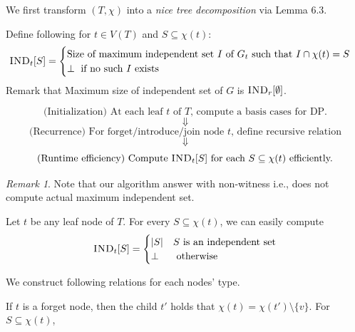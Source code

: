 \documentclass[12pt, a4paper, openany, twoside]{book}
\theoremstyle{definition}
\theoremstyle{remark}
\newtheorem{rem}[thm]{Remark}
\theoremstyle{plain}
\numberwithin{equation}{section}
\begin{document}
\begin{tcolorbox}[colback=yellow!10!white,colframe=gray!75!black,title=Step 0]

We first transform $(T, \chi)$ into a \textit{nice tree decomposition} via Lemma 6.3. 

\end{tcolorbox}

\begin{tcolorbox}[colback=yellow!10!white,colframe=gray!75!black,title=Step 1]

Define following for $t \in V(T)$ and $S \subseteq \chi(t)$: 
\[\textsc{IND}_t[S] = \begin{cases}
    \text{Size of maximum independent set $I$ of $G_t$ such that $I \cap \chi(t) = S$} \\
    \perp \text{ if no such $I$ exists }
\end{cases}\]
Remark that Maximum size of independent set of $G$ is $\textsc{IND}_r[\emptyset]$. 
\end{tcolorbox}

\begin{tcolorbox}[colback=yellow!10!white,colframe=violet!75!white,title=Planning Mode]
    \[\text{(Initialization) At each leaf $t$ of $T$, compute a basis cases for DP.}\] 
    \[\Downarrow\]
    \[\text{(Recurrence) For forget/introduce/join node $t$, define recursive relation}\]
    \[\Downarrow\]
    \[\text{(Runtime efficiency) Compute $\textsc{IND}_t[S]$ for each $S \subseteq \chi(t)$ efficiently.}\]
\end{tcolorbox}

\begin{rem}
Note that our algorithm answer with non-witness i.e., does not compute actual maximum independent set. 
\end{rem}

\begin{tcolorbox}[colback=yellow!10!white,colframe=gray!75!black,title=Initialization]

Let $t$ be any leaf node of $T$. For every $S \subseteq \chi(t)$, we can easily compute 
\[\textsc{IND}_t[S] = \begin{cases}
    |S| & S \text{ is an independent set} \\
    \perp & \text{ otherwise }
\end{cases}\]

\end{tcolorbox}

\begin{tcolorbox}[colback=yellow!10!white,colframe=gray!75!black,title=Recurrence]

We construct following relations for each nodes' type. 

\end{tcolorbox}

If $t$ is a forget node, then the child $t'$ holds that $\chi(t) = \chi(t') \setminus \{v\}$. For $S \subseteq \chi(t)$, 
\[\]
\end{document}
